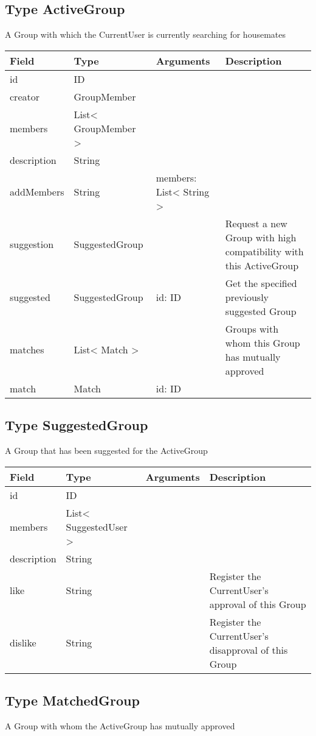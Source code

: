 \hypertarget{type-activegroup}{%
\subsection{Type ActiveGroup}\label{type-activegroup}}

A Group with which the CurrentUser is currently searching for housemates

\begin{longtable}[]{@{}llll@{}}
\toprule
Field & Type & Arguments & Description\tabularnewline
\midrule
\endhead
id & ID & &\tabularnewline
creator & GroupMember & &\tabularnewline
members & List\textless{} GroupMember \textgreater{} & &\tabularnewline
description & String & &\tabularnewline
addMembers & String & members: List\textless{} String \textgreater{}
&\tabularnewline
suggestion & SuggestedGroup & & Request a new Group with high
compatibility with this ActiveGroup\tabularnewline
suggested & SuggestedGroup & id: ID & Get the specified previously
suggested Group\tabularnewline
matches & List\textless{} Match \textgreater{} & & Groups with whom this
Group has mutually approved\tabularnewline
match & Match & id: ID &\tabularnewline
\bottomrule
\end{longtable}

\hypertarget{type-suggestedgroup}{%
\subsection{Type SuggestedGroup}\label{type-suggestedgroup}}

A Group that has been suggested for the ActiveGroup

\begin{longtable}[]{@{}llll@{}}
\toprule
Field & Type & Arguments & Description\tabularnewline
\midrule
\endhead
id & ID & &\tabularnewline
members & List\textless{} SuggestedUser \textgreater{} &
&\tabularnewline
description & String & &\tabularnewline
like & String & & Register the CurrentUser's approval of this
Group\tabularnewline
dislike & String & & Register the CurrentUser's disapproval of this
Group\tabularnewline
\bottomrule
\end{longtable}

\hypertarget{type-matchedgroup}{%
\subsection{Type MatchedGroup}\label{type-matchedgroup}}

A Group with whom the ActiveGroup has mutually approved

